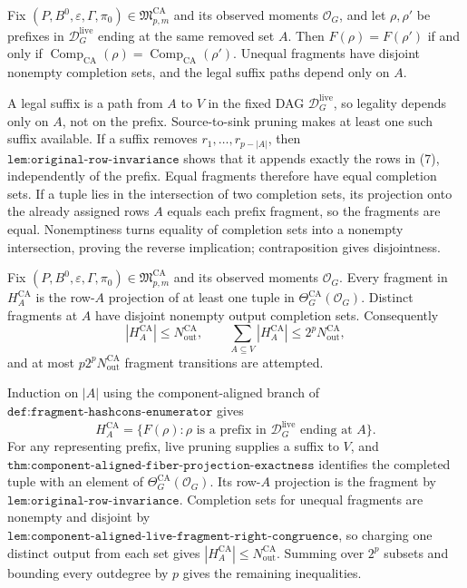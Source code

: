 Fix \((P,B^0,\varepsilon,\Gamma,\pi_0)\in\mathfrak M_{p,m}^{\mathrm{CA}}\) and its observed moments \(\mathcal O_G\), and let \(\rho,\rho'\) be prefixes in \(\mathcal D_G^{\mathrm{live}}\) ending at the same removed set \(A\).  Then \(F(\rho)=F(\rho')\) if and only if \(\operatorname{Comp}_{\mathrm{CA}}(\rho)=\operatorname{Comp}_{\mathrm{CA}}(\rho')\).  Unequal fragments have disjoint nonempty completion sets, and the legal suffix paths depend only on \(A\).

A legal suffix is a path from \(A\) to \(V\) in the fixed DAG \(\mathcal D_G^{\mathrm{live}}\), so legality depends only on \(A\), not on the prefix.  Source-to-sink pruning makes at least one such suffix available.  If a suffix removes \(r_1,\ldots,r_{p-|A|}\), then \(\texttt{lem:original-row-invariance}\) shows that it appends exactly the rows in (7), independently of the prefix.  Equal fragments therefore have equal completion sets.  If a tuple lies in the intersection of two completion sets, its projection onto the already assigned rows \(A\) equals each prefix fragment, so the fragments are equal.  Nonemptiness turns equality of completion sets into a nonempty intersection, proving the reverse implication; contraposition gives disjointness.

Fix \((P,B^0,\varepsilon,\Gamma,\pi_0)\in\mathfrak M_{p,m}^{\mathrm{CA}}\) and its observed moments \(\mathcal O_G\).  Every fragment in \(H_A^{\mathrm{CA}}\) is the row-\(A\) projection of at least one tuple in \(\Theta_G^{\mathrm{CA}}(\mathcal O_G)\).  Distinct fragments at \(A\) have disjoint nonempty output completion sets.  Consequently
\[
 |H_A^{\mathrm{CA}}|\le N_{\mathrm{out}}^{\mathrm{CA}},
 \qquad
 \sum_{A\subseteq V}|H_A^{\mathrm{CA}}|
 \le2^pN_{\mathrm{out}}^{\mathrm{CA}},
\]
and at most \(p2^pN_{\mathrm{out}}^{\mathrm{CA}}\) fragment transitions are attempted.

Induction on \(|A|\) using the component-aligned branch of \(\texttt{def:fragment-hashcons-enumerator}\) gives
\[
 H_A^{\mathrm{CA}}
 =\{F(\rho):\rho\text{ is a prefix in }
 \mathcal D_G^{\mathrm{live}}\text{ ending at }A\}.
\]
For any representing prefix, live pruning supplies a suffix to \(V\), and \(\texttt{thm:component-aligned-fiber-projection-exactness}\) identifies the completed tuple with an element of \(\Theta_G^{\mathrm{CA}}(\mathcal O_G)\).  Its row-\(A\) projection is the fragment by \(\texttt{lem:original-row-invariance}\).  Completion sets for unequal fragments are nonempty and disjoint by \(\texttt{lem:component-aligned-live-fragment-right-congruence}\), so charging one distinct output from each set gives \(|H_A^{\mathrm{CA}}|\le N_{\mathrm{out}}^{\mathrm{CA}}\).  Summing over \(2^p\) subsets and bounding every outdegree by \(p\) gives the remaining inequalities.

